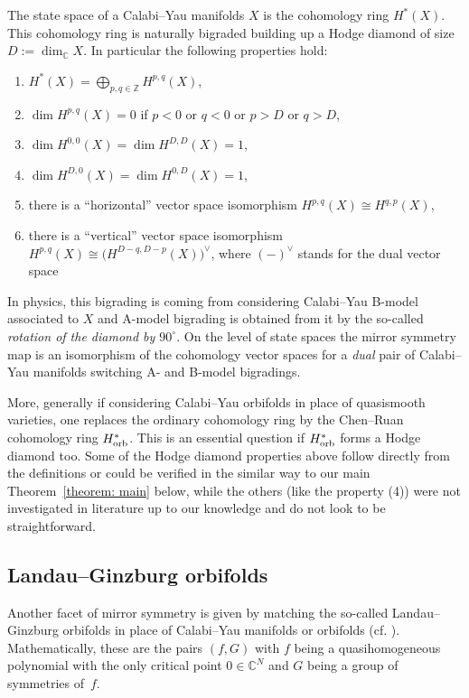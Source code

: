 \documentclass[10pt,a4paper]{amsart}
\numberwithin{equation}{section}
\newcommand{\CC}{{\mathbb{C}}}
\newcommand{\ZZ}{{\mathbb{Z}}}
\begin{document}
The state space of a Calabi--Yau manifolds $X$ is the cohomology ring $H^\ast(X)$.
This cohomology ring is naturally bigraded building up a Hodge diamond of size $D := \dim_\CC X$. In particular the following properties hold:
\begin{enumerate}\itemsep=0pt
 \item[(1)] $H^\ast(X) = \bigoplus_{p,q \in \ZZ} H^{p,q}(X)$,
 \item[(2)] $\dim H^{p,q}(X) = 0$ if $p <0$ or $q <0$ or $p > D$ or $q > D$,
 \item[(3)] $\dim H^{0,0}(X) = \dim H^{D,D}(X) = 1$,
 \item[(4)] $\dim H^{D,0}(X) = \dim H^{0,D}(X) = 1$,
 \item[(5)] there is a ``horizontal'' vector space isomorphism $H^{p,q}(X) \cong H^{q,p}(X)$,
 \item[(6)] there is a ``vertical'' vector space isomorphism $H^{p,q}(X) \cong \bigl(H^{D-q,D-p}(X)\bigr)^\vee$, where $(-)^\vee$ stands for the dual vector space
\end{enumerate}

In physics, this bigrading is coming from considering Calabi--Yau B-model associated to $X$ and A-model bigrading is obtained from it by the so-called {\itshape rotation of the diamond by $90^\circ$}.
On the level of state spaces the mirror symmetry map is an isomorphism of the cohomology vector spaces for a {\itshape dual} pair of Calabi--Yau manifolds switching A- and B-model bigradings.

More, generally if considering Calabi--Yau orbifolds in place of quasismooth varieties, one replaces the ordinary cohomology ring by the Chen--Ruan cohomology ring $H^\ast_{\rm orb}$.
This is an essential question if $H^\ast_{\rm orb}$ forms a Hodge diamond too. Some of the Hodge diamond properties above follow directly from the definitions or could be verified in the similar way to our main Theorem~\ref{theorem: main} below, while the others (like the property (4)) were not investigated in literature up to our knowledge and do not look to be straightforward.

\subsection{Landau--Ginzburg orbifolds}
Another facet of mirror symmetry is given by matching the so-called Landau--Ginzburg orbifolds in place of Calabi--Yau manifolds or orbifolds (cf. \cite{IV90,Kreu94,S20,V89,W93}). Mathematically, these are the pairs $(f,G)$ with $f$ being a quasihomogeneous polynomial with the only critical point $0 \in \CC^N$ and $G$ being a group of symmetries of~$f$.
\end{document}
